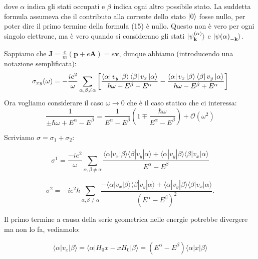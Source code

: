 \documentclass[12pt,a4paper]{article}
\begin{document}
dove $\alpha$ indica gli stati occupati e $\beta$ indica ogni altro possibile stato. La suddetta formula assumeva che il contributo alla corrente dello stato $\ket{0}$ fosse nullo, per poter dire il primo termine della formula (15) è nullo.  Questo non è vero per ogni singolo elettrone, ma è vero quando si considerano gli stati 
$\ket{\psi^{(\alpha)}_{\mathbf{k}}}$ e $\ket{\psi{(\alpha)}_{\mathbf{-k}}}$.

Sappiamo che $\mathbf{J} = \frac{e}{m} \left( \mathbf{p} + e \mathbf{A} \right) = e \mathbf{v}$, dunque abbiamo (introducendo una notazione semplificata):
\begin{equation}
\sigma_{xy} (\omega) = - \frac{i e^2}{\omega} \sum_{\alpha, \beta \neq \alpha} \left[ \frac{ \bra{\alpha}v_{y}  \ket{\beta} \bra{\beta} v_{x} \ket{\alpha}}{\hbar \omega + E^{\beta} - E^{\alpha}} -
 \frac{ \bra{\alpha} v_{x}  \ket{\beta} \bra{\beta} v_{y} \ket{\alpha}}{\hbar \omega - E^{\beta} + E^{\alpha}}
\right]
\end{equation}
Ora vogliamo considerare il caso $\omega \rightarrow 0$ che è il caso statico che ci interessa: 
\begin{equation}
\frac1{\pm\hbar\omega + E^{\alpha} - E^{\beta}} = \frac1{E^{\alpha} - E^{\beta}}\left(1 \mp \frac{\hbar\omega}{E^{\alpha} - E^{\beta}}\right) + \mathcal O(\omega^2)
\end{equation}


Scriviamo $\sigma = \sigma_1 + \sigma_2$:

\begin{equation}
\sigma^1 = \frac{-ie^2}{\omega} \sum_{\alpha,\beta \neq \alpha} \frac{\langle \alpha|v_x|\beta \rangle \langle \beta|v_y|\alpha \rangle + \langle \alpha|v_y|\beta \rangle \langle \beta|v_x|\alpha \rangle}{E^{\alpha} - E^{\beta}}
\end{equation}

\begin{equation}
\sigma^2 = -ie^2\hbar \sum_{\alpha,\beta \neq \alpha} \frac{- \langle \alpha|v_x|\beta \rangle \langle \beta|v_y|\alpha \rangle + \langle \alpha|v_y|\beta \rangle \langle \beta|v_x|\alpha \rangle}{(E^\alpha - E^\beta)^2} .
\end{equation}

Il primo termine a causa della serie geometrica nelle energie potrebbe divergere ma non lo fa, vediamolo:

\[ \langle \alpha | v_x | \beta \rangle = \langle \alpha | H_0 x - x H_0 | \beta \rangle = (E^{\alpha}-E^{\beta}) \langle \alpha | x | \beta \rangle \]
\end{document}
